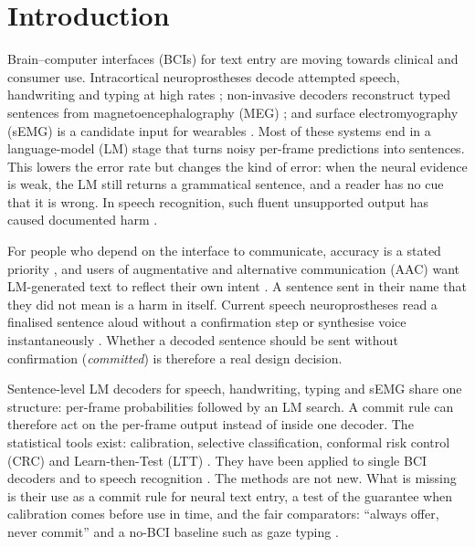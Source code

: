 \section{Introduction}
\label{sec:intro}

Brain--computer interfaces (BCIs) for text entry are moving towards clinical and consumer use. Intracortical neuroprostheses decode attempted speech, handwriting and typing at high rates \citep{willett2023speech,card2024accurate,metzger2023avatar,willett2021handwriting,jude2026bimanual}; non-invasive decoders reconstruct typed sentences from magnetoencephalography (MEG) \citep{levy2026brain2qwerty,zhang2026brain2qwertyv2}; and surface electromyography (sEMG) is a candidate input for wearables \citep{sivakumar2024emg2qwerty,achituve2025emg,ctrllabs2025generic}. Most of these systems end in a language-model (LM) stage that turns noisy per-frame predictions into sentences. This lowers the error rate but changes the kind of error: when the neural evidence is weak, the LM still returns a grammatical sentence, and a reader has no cue that it is wrong. In speech recognition, such fluent unsupported output has caused documented harm \citep{koenecke2024careless}.

For people who depend on the interface to communicate, accuracy is a stated priority \citep{huggins2011als,huggins2015sci,blabe2015assessment,kubler2014ucd}, and users of augmentative and alternative communication (AAC) want LM-generated text to reflect their own intent \citep{valencia2023aac,kane2017avuncular}. A sentence sent in their name that they did not mean is a harm in itself. Current speech neuroprostheses read a finalised sentence aloud without a confirmation step \citep{card2024accurate} or synthesise voice instantaneously \citep{wairagkar2025voice}. Whether a decoded sentence should be sent without confirmation (\emph{committed}) is therefore a real design decision.

Sentence-level LM decoders for speech, handwriting, typing and sEMG share one structure: per-frame probabilities followed by an LM search. A commit rule can therefore act on the per-frame output instead of inside one decoder. The statistical tools exist: calibration, selective classification, conformal risk control (CRC) and Learn-then-Test (LTT) \citep{guo2017calibration,geifman2017selective,bates2021rcps,angelopoulos2024crc,angelopoulos2025ltt}. They have been applied to single BCI decoders \citep{kim2025confidence,huang2025cocontrol} and to speech recognition \citep{damri2026risk}. The methods are not new. What is missing is their use as a commit rule for neural text entry, a test of the guarantee when calibration comes before use in time, and the fair comparators: ``always offer, never commit'' and a no-BCI baseline such as gaze typing \citep{cai2024gaze}.

